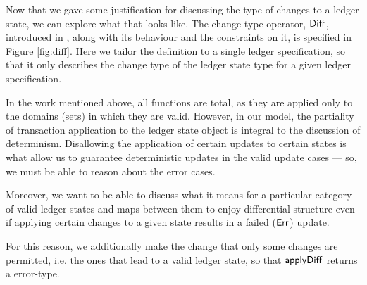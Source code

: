 Now that we gave some justification for discussing the type of changes to a ledger
state, we can explore what that looks like. The change type operator, $\mathsf{Diff}$, introduced
in \cite{changes}, along with its behaviour and the constraints on it, is specified in Figure \ref{fig:diff}.
Here we tailor the definition to a single ledger specification, so that it only
describes the change type of the ledger state type for a given ledger specification.

In the work mentioned above, all functions are total, as they are applied only
to the domains (sets) in which they are valid.
However, in our model, the partiality of transaction application
to the ledger state object is integral to the discussion of determinism.
Disallowing the application of certain updates to certain states is what
allow us to guarantee deterministic updates in the valid update cases --- so, we
must be able to reason about the error cases.

Moreover, we want to be able to discuss
what it means for a particular category of valid ledger states and maps between them
to enjoy differential structure even if applying certain changes to a given
state results in a failed ($\mathsf{Err}$) update.

For this reason, we additionally make the change that only some changes are permitted, i.e. the
ones that lead to a valid ledger state, so that $\mathsf{applyDiff}$ returns
a error-type.

